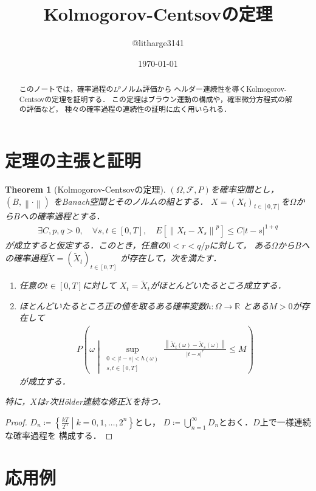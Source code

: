\documentclass[dvipdfmx,autodetect-engine]{jsarticle}
\newtheorem{theorem}{Theorem}[section]
\theoremstyle{remark}
\theoremstyle{definition}
\newcommand{\R}{\mathbb{R}}
\newcommand{\abs}[1]{\left\lvert#1\right\rvert}
\newcommand{\norm}[1]{\left\lVert#1\right\rVert}
\newcommand{\setmid}{\mathrel{} \middle| \mathrel{}}
\begin{document}
\title{Kolmogorov-Centsovの定理}
\author{@litharge3141}
\date{\today}
\maketitle

\begin{abstract}
    このノートでは，確率過程の$L^p$ノルム評価から
    ヘルダー連続性を導くKolmogorov-Centsovの定理を証明する．
    この定理はブラウン運動の構成や，確率微分方程式の解の評価など，
    種々の確率過程の連続性の証明に広く用いられる．
\end{abstract}

\section{定理の主張と証明}
\begin{theorem}[Kolmogorov-Centsovの定理]
    $(\Omega,\mathcal{F},P)$を確率空間とし，$(B,\norm{\cdot})$
    をBanach空間とそのノルムの組とする．
    $X=(X_{t})_{t \in [0,T]}$を$\Omega$から$B$への確率過程とする．
    \begin{align}
        \exists C,p,q>0,\quad \forall s,t \in [0,T],
        \quad E[\norm{X_{t} - X_{s}}^p] \leq C \abs{t-s}^{1+q}
    \end{align}
    が成立すると仮定する．このとき，任意の$0 < r < q/p$に対して，
    ある$\Omega$から$B$への確率過程$\tilde{X}=(\tilde{X}_{t})_{t \in [0,T]}$
    が存在して，次を満たす．
    \begin{enumerate}
        \item 任意の$t \in [0,T]$に対して
        $X_t = \tilde{X}_t$がほとんどいたるところ成立する．
        \item ほとんどいたるところ正の値を取るある確率変数$h\colon \Omega \to \R$
        とある$M>0$が存在して
        \begin{align}
            P\left(\omega \setmid 
            \sup_{\substack{0 < \abs{t-s} < h(\omega) \\ s,t \in [0,T]}}
            \frac{\norm{\tilde{X}_{t}(\omega) - 
            \tilde{X}_{s}(\omega)}}{\abs{t-s}^{r}} 
            \leq M
            \right)
        \end{align}
        が成立する．
    \end{enumerate}
    特に，$X$は$r$次H\"{o}lder連続な修正$\tilde{X}$を持つ．
\end{theorem}

\begin{proof}
    $D_{n} \coloneqq \left\{\frac{kT}{2^n} \setmid k=0,1,\ldots,2^{n}\right\}$とし，
    $D \coloneqq \bigcup_{n=1}^{\infty} D_n$とおく．$D$上で一様連続な確率過程を
    構成する．
\end{proof}

\section{応用例}
\end{document}
